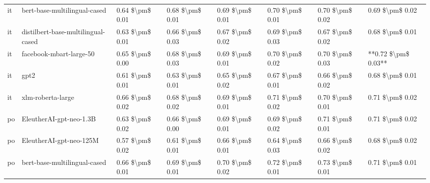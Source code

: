 \begin{tabular}{llllllll}
      it &       bert-base-multilingual-cased & 0.64 \$\textbackslash pm\$ 0.01 &           0.68 \$\textbackslash pm\$ 0.01 &       0.69 \$\textbackslash pm\$ 0.01 &        0.70 \$\textbackslash pm\$ 0.01 &                         0.70 \$\textbackslash pm\$ 0.02 &     0.69 \$\textbackslash pm\$ 0.02 \\
      it & distilbert-base-multilingual-cased & 0.63 \$\textbackslash pm\$ 0.01 &           0.66 \$\textbackslash pm\$ 0.03 &       0.67 \$\textbackslash pm\$ 0.02 &        0.69 \$\textbackslash pm\$ 0.03 &                         0.67 \$\textbackslash pm\$ 0.02 &     0.68 \$\textbackslash pm\$ 0.01 \\
      it &            facebook-mbart-large-50 & 0.65 \$\textbackslash pm\$ 0.00 &           0.68 \$\textbackslash pm\$ 0.03 &       0.69 \$\textbackslash pm\$ 0.01 &        0.70 \$\textbackslash pm\$ 0.02 &                         0.70 \$\textbackslash pm\$ 0.03 & **0.72 \$\textbackslash pm\$ 0.03** \\
      it &                               gpt2 & 0.61 \$\textbackslash pm\$ 0.01 &           0.63 \$\textbackslash pm\$ 0.01 &       0.65 \$\textbackslash pm\$ 0.02 &        0.67 \$\textbackslash pm\$ 0.01 &                         0.66 \$\textbackslash pm\$ 0.02 &     0.68 \$\textbackslash pm\$ 0.01 \\
      it &                  xlm-roberta-large & 0.66 \$\textbackslash pm\$ 0.02 &           0.68 \$\textbackslash pm\$ 0.02 &       0.69 \$\textbackslash pm\$ 0.01 &        0.71 \$\textbackslash pm\$ 0.02 &                         0.70 \$\textbackslash pm\$ 0.01 &     0.71 \$\textbackslash pm\$ 0.02 \\
      po &            EleutherAI-gpt-neo-1.3B & 0.63 \$\textbackslash pm\$ 0.02 &           0.66 \$\textbackslash pm\$ 0.00 &       0.69 \$\textbackslash pm\$ 0.01 &        0.69 \$\textbackslash pm\$ 0.02 &                         0.71 \$\textbackslash pm\$ 0.01 &     0.71 \$\textbackslash pm\$ 0.02 \\
      po &            EleutherAI-gpt-neo-125M & 0.57 \$\textbackslash pm\$ 0.02 &           0.61 \$\textbackslash pm\$ 0.01 &       0.66 \$\textbackslash pm\$ 0.01 &        0.64 \$\textbackslash pm\$ 0.03 &                         0.66 \$\textbackslash pm\$ 0.02 &     0.68 \$\textbackslash pm\$ 0.02 \\
      po &       bert-base-multilingual-cased & 0.66 \$\textbackslash pm\$ 0.01 &           0.69 \$\textbackslash pm\$ 0.01 &       0.70 \$\textbackslash pm\$ 0.02 &        0.72 \$\textbackslash pm\$ 0.01 &                         0.73 \$\textbackslash pm\$ 0.01 &     0.71 \$\textbackslash pm\$ 0.01 \\

\end{tabular}

